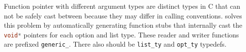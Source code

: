 Function pointer with different argument types are distinct types in C that
can not be safely cast between because they may differ in calling
conventions. \asdlgen{} solves this problem by automatically generating
function stubs that internally cast the \lstinline[language=c]!void*! pointers for each option
and list type. These reader and writer functions are prefixed
\lstinline[language=c]!generic_!. There also should be \lstinline[language=c]!list_ty!
and \lstinline[language=c]!opt_ty! typedefs.
